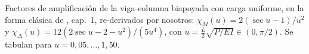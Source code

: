 Factores de amplificación de la viga-columna biapoyada con carga uniforme, en la forma clásica de \cite{timoshenko}, cap.~1, re-derivados por nosotros: $\chi_M(u)=2(\sec u-1)/u^2$ y $\chi_\Delta(u)=12(2\sec u-2-u^2)/(5u^4)$, con $u=\tfrac{L}{2}\sqrt{P/EI}\in(0,\pi/2)$. Se tabulan para $u=0{,}05,\dots,1{,}50$.
